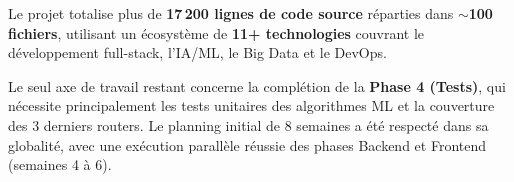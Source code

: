 \documentclass[12pt,a4paper]{article}
\begin{document}
Le projet totalise plus de \textbf{17\,200 lignes de code source} réparties dans \textbf{$\sim$100 fichiers}, utilisant un écosystème de \textbf{11+ technologies} couvrant le développement full-stack, l'IA/ML, le Big Data et le DevOps.

Le seul axe de travail restant concerne la complétion de la \textbf{Phase 4 (Tests)}, qui nécessite principalement les tests unitaires des algorithmes ML et la couverture des 3 derniers routers. Le planning initial de 8 semaines a été respecté dans sa globalité, avec une exécution parallèle réussie des phases Backend et Frontend (semaines 4 à 6).
\end{document}
